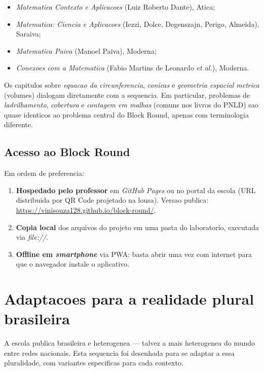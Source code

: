 \documentclass[12pt,a4paper]{scrartcl}
\begin{document}
\begin{itemize}[leftmargin=1.3em,itemsep=0.1em,topsep=0.2em,nosep]
  \item \emph{Matematica Contexto e Aplicacoes} (Luiz Roberto Dante), Atica;
  \item \emph{Matematica: Ciencia e Aplicacoes} (Iezzi, Dolce, Degenszajn, Perigo, Almeida), Saraiva;
  \item \emph{Matematica Paiva} (Manoel Paiva), Moderna;
  \item \emph{Conexoes com a Matematica} (Fabio Martins de Leonardo \emph{et al.}), Moderna.
\end{itemize}

Os capitulos sobre \emph{equacao da circunferencia}, \emph{conicas} e \emph{geometria espacial metrica} (volumes) dialogam diretamente com a sequencia. Em particular, problemas de \emph{ladrilhamento}, \emph{cobertura} e \emph{contagem em malhas} (comuns nos livros do PNLD) sao quase identicos ao problema central do Block Round, apenas com terminologia diferente.

\subsection{Acesso ao Block Round}

Em ordem de preferencia:

\begin{enumerate}[leftmargin=1.5em,itemsep=0.15em,topsep=0.3em]
  \item \textbf{Hospedado pelo professor} em \emph{GitHub Pages} ou no portal da escola (URL distribuida por QR Code projetado na lousa). Versao publica: \url{https://vinisouza128.github.io/block-round/}.
  \item \textbf{Copia local} dos arquivos do projeto em uma pasta do laboratorio, executada via \emph{file://}.
  \item \textbf{Offline em \emph{smartphone}} via PWA: basta abrir uma vez com internet para que o navegador instale o aplicativo.
\end{enumerate}

\section{Adaptacoes para a realidade plural brasileira}\label{sec:adapt}

A escola publica brasileira e heterogenea --- talvez a mais heterogenea do mundo entre redes nacionais. Esta sequencia foi desenhada para se adaptar a essa pluralidade, com variantes especificas para cada contexto.
\end{document}
